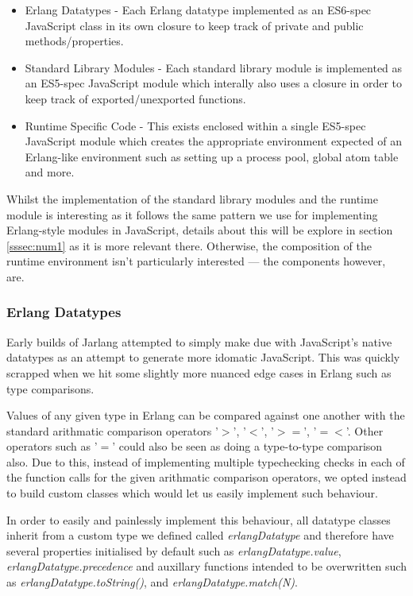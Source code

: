 \documentclass[twoside,12pt,titlepage,a4paper]{article}
\begin{document}
\begin{itemize}
\item Erlang Datatypes - Each Erlang datatype implemented as an ES6-spec JavaScript class in its own closure to keep track of private and public methods/properties.
\item Standard Library Modules - Each standard library module is implemented as an ES5-spec JavaScript module which interally also uses a closure in order to keep track of exported/unexported functions.
\item Runtime Specific Code - This exists enclosed within a single ES5-spec JavaScript module which creates the appropriate environment expected of an Erlang-like environment such as setting up a process pool, global atom table and more.
\end{itemize}

Whilst the implementation of the standard library modules and the runtime module is interesting as it follows the same pattern we use for implementing Erlang-style modules in JavaScript, details about this will be explore in section \ref{sssec:num1} as it is more relevant there. Otherwise, the composition of the runtime environment isn't particularly interested --- the components however, are.

\subsubsection{Erlang Datatypes}
Early builds of Jarlang attempted to simply make due with JavaScript's native datatypes as an attempt to generate more idomatic JavaScript. This was quickly scrapped when we hit some slightly more nuanced edge cases in Erlang such as type comparisons.

Values of any given type in Erlang can be compared against one another with the standard arithmatic comparison operators '$>$', '$<$', '$>=$', '$=<$'. Other operators such as '$=$' could also be seen as doing a type-to-type comparison also. Due to this, instead of implementing multiple typechecking checks in each of the function calls for the given arithmatic comparison operators, we opted instead to build custom classes which would let us easily implement such behaviour.

In order to easily and painlessly implement this behaviour, all datatype classes inherit from a custom type we defined called \textit{erlangDatatype} and therefore have several properties initialised by default such as \textit{erlangDatatype.value}, \textit{erlangDatatype.precedence} and auxillary functions intended to be overwritten such as \textit{erlangDatatype.toString()}, and \textit{erlangDatatype.match(N)}.
\end{document}
